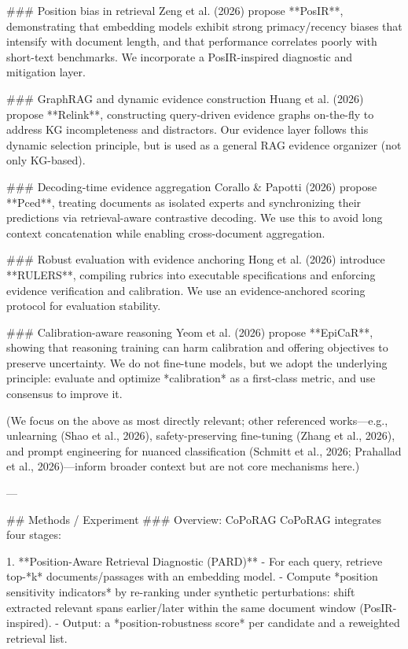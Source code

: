 ### Position bias in retrieval  
Zeng et al. (2026) propose **PosIR**, demonstrating that embedding models exhibit strong primacy/recency biases that intensify with document length, and that performance correlates poorly with short-text benchmarks. We incorporate a PosIR-inspired diagnostic and mitigation layer.

### GraphRAG and dynamic evidence construction  
Huang et al. (2026) propose **Relink**, constructing query-driven evidence graphs on-the-fly to address KG incompleteness and distractors. Our evidence layer follows this dynamic selection principle, but is used as a general RAG evidence organizer (not only KG-based).

### Decoding-time evidence aggregation  
Corallo & Papotti (2026) propose **Pced**, treating documents as isolated experts and synchronizing their predictions via retrieval-aware contrastive decoding. We use this to avoid long context concatenation while enabling cross-document aggregation.

### Robust evaluation with evidence anchoring  
Hong et al. (2026) introduce **RULERS**, compiling rubrics into executable specifications and enforcing evidence verification and calibration. We use an evidence-anchored scoring protocol for evaluation stability.

### Calibration-aware reasoning  
Yeom et al. (2026) propose **EpiCaR**, showing that reasoning training can harm calibration and offering objectives to preserve uncertainty. We do not fine-tune models, but we adopt the underlying principle: evaluate and optimize *calibration* as a first-class metric, and use consensus to improve it.

(We focus on the above as most directly relevant; other referenced works—e.g., unlearning (Shao et al., 2026), safety-preserving fine-tuning (Zhang et al., 2026), and prompt engineering for nuanced classification (Schmitt et al., 2026; Prahallad et al., 2026)—inform broader context but are not core mechanisms here.)

---

## Methods / Experiment  
### Overview: CoPoRAG  
CoPoRAG integrates four stages:

1. **Position-Aware Retrieval Diagnostic (PARD)**  
   - For each query, retrieve top-*k* documents/passages with an embedding model.  
   - Compute *position sensitivity indicators* by re-ranking under synthetic perturbations: shift extracted relevant spans earlier/later within the same document window (PosIR-inspired).  
   - Output: a *position-robustness score* per candidate and a reweighted retrieval list.

